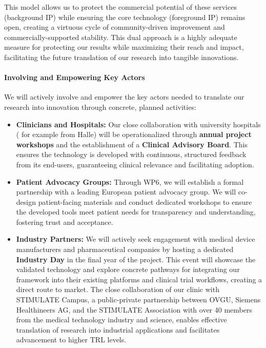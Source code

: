 \documentclass[11pt, a4paper]{article}
\begin{document}
This model allows us to protect the commercial potential of these services (background IP) while ensuring the core technology (foreground IP) remains open, creating a virtuous cycle of community-driven improvement and commercially-supported stability. This dual approach is a highly adequate measure for protecting our results while maximizing their reach and impact, facilitating the future translation of our research into tangible innovations.

\paragraph{Involving and Empowering Key Actors}
We will actively involve and empower the key actors needed to translate our research into innovation through concrete, planned activities:
\begin{itemize}
    \item \textbf{Clinicians and Hospitals:} Our close collaboration with university hospitals ( for example from Halle) will be operationalized through \textbf{annual project workshops} and the establishment of a \textbf{Clinical Advisory Board}. This ensures the technology is developed with continuous, structured feedback from its end-users, guaranteeing clinical relevance and facilitating adoption.
    \item \textbf{Patient Advocacy Groups:} Through WP6, we will establish a formal partnership with a leading European patient advocacy group. We will co-design patient-facing materials and conduct dedicated workshops to ensure the developed tools meet patient needs for transparency and understanding, fostering trust and acceptance.
    \item \textbf{Industry Partners:} We will actively seek engagement with medical device manufacturers and pharmaceutical companies by hosting a dedicated \textbf{Industry Day} in the final year of the project. This event will showcase the validated technology and explore concrete pathways for integrating our framework into their existing platforms and clinical trial workflows, creating a direct route to market. The close collaboration of our clinic with STIMULATE Campus, a public-private partnership between OVGU, Siemens Healthineers AG, and the STIMULATE Association with over 40 members from the medical technology industry and science, enables effective translation of research into industrial applications and facilitates advancement to higher TRL levels.  \end{itemize}
\end{document}
